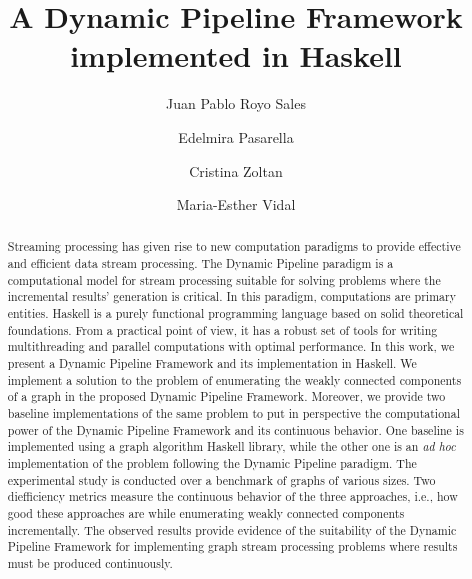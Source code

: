 \documentclass[preprint]{elsarticle}
\begin{document}
\title{A Dynamic Pipeline Framework implemented in Haskell}

%
\author[1]{Juan Pablo Royo Sales}

\author[1]{Edelmira Pasarella}

\author[1]{Cristina Zoltan}

\author[2,3,4]{Maria-Esther Vidal}






\begin{abstract}
Streaming processing has given rise to new computation paradigms to provide effective and efficient data stream processing. 
The Dynamic Pipeline paradigm is a computational model for stream processing suitable for solving problems where the incremental results' generation is critical. In this paradigm, computations are primary entities. Haskell is a purely functional programming language based on solid theoretical foundations. From a practical point of view, it has a robust set of tools for writing multithreading and parallel computations with optimal performance. In this work, we present a Dynamic Pipeline Framework and its implementation in Haskell. 
We implement a solution to the problem of enumerating the weakly connected components of a graph in the proposed Dynamic Pipeline Framework. Moreover, we provide two baseline implementations of the same problem to put in perspective the computational power of the Dynamic Pipeline Framework and its continuous behavior. One baseline is implemented using a graph algorithm Haskell library, while the other one is an \textit{ad hoc} implementation of the problem following the Dynamic Pipeline paradigm.
The experimental study is conducted over a benchmark of graphs of various sizes. 
Two diefficiency metrics measure the continuous behavior of the three approaches, i.e., how good these approaches are while enumerating weakly connected components incrementally. The observed results provide evidence of the suitability of the Dynamic Pipeline Framework for implementing graph stream processing problems where results must be produced continuously. 
\end{abstract}
\end{document}
